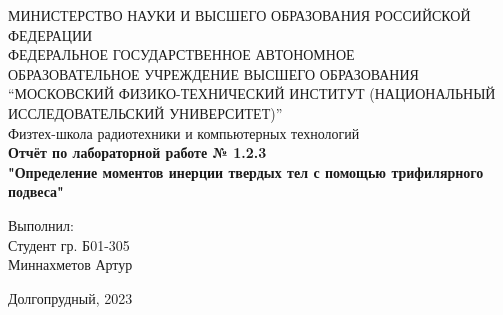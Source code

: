 \begin{center}
МИНИСТЕРСТВО НАУКИ И ВЫСШЕГО ОБРАЗОВАНИЯ РОССИЙСКОЙ ФЕДЕРАЦИИ\\
\hfill \break
ФЕДЕРАЛЬНОЕ ГОСУДАРСТВЕННОЕ АВТОНОМНОЕ \\ ОБРАЗОВАТЕЛЬНОЕ УЧРЕЖДЕНИЕ ВЫСШЕГО ОБРАЗОВАНИЯ \\
“МОСКОВСКИЙ ФИЗИКО-ТЕХНИЧЕСКИЙ ИНСТИТУТ (НАЦИОНАЛЬНЫЙ ИССЛЕДОВАТЕЛЬСКИЙ УНИВЕРСИТЕТ)” \\

\hfill \break
Физтех-школа радиотехники и компьютерных технологий\\
\vspace{2.5cm}
\large{\textbf{Отчёт по лабораторной работе № 1.2.3}}\\
\large{\textbf{"Определение моментов инерции твердых тел с помощью трифилярного подвеса"}}\\
\hfill \break
\end{center}

\vspace{5cm}

\begin{flushright}
Выполнил:\\
Студент гр. Б01-305\\
Миннахметов Артур\\
\end{flushright}

\vfill


\begin{center} Долгопрудный, 2023 \end{center}

\thispagestyle{empty}
\newpage
